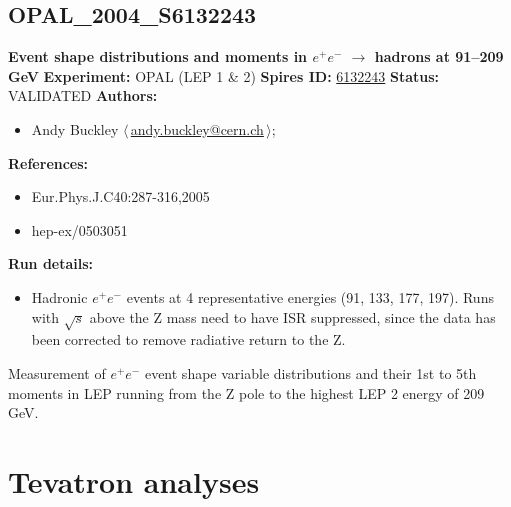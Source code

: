 \subsection{OPAL\_2004\_S6132243}
\textbf{Event shape distributions and moments in $e^+ e^-$ \ensuremath{\to} hadrons at 91--209 GeV}\newline
\textbf{Experiment:} OPAL (LEP 1 \& 2) \newline
\textbf{Spires ID:} \href{http://www.slac.stanford.edu/spires/find/hep/www?rawcmd=key+6132243}{6132243}\newline
\textbf{Status:} VALIDATED\newline
\textbf{Authors:}
\begin{itemize}
  \item Andy Buckley $\langle\,$\href{mailto:andy.buckley@cern.ch}{andy.buckley@cern.ch}$\,\rangle$;
\end{itemize}
\textbf{References:}
\begin{itemize}
  \item Eur.Phys.J.C40:287-316,2005
  \item hep-ex/0503051
\end{itemize}
\textbf{Run details:}
\begin{itemize}

  \item Hadronic $e^+ e^-$ events at 4 representative energies (91, 133, 177, 197). Runs with \ensuremath{\sqrt{s}} above the Z mass need to have ISR suppressed, since the data has been corrected to remove radiative return to the Z.\end{itemize}

\noindent Measurement of $e^+ e^-$ event shape variable distributions and their 1st  to 5th moments in LEP running from the Z pole to the highest LEP 2 energy of 209 GeV.

\clearpage


\section{Tevatron analyses}
